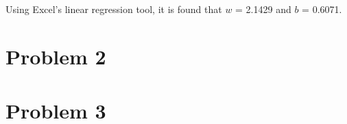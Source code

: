 \documentclass{article}
\begin{document}
\subsection{}
Using Excel's linear regression tool, it is found that $w$ = 2.1429 and $b$ = 0.6071.



\section{Problem 2}
\subsection{}
\subsection{}
\subsection{}
\subsection{}
\subsection{}


\section{Problem 3}
\subsection{}
\subsection{}
\subsection{}
\subsection{}
\subsection{}
\subsection{}
\end{document}
